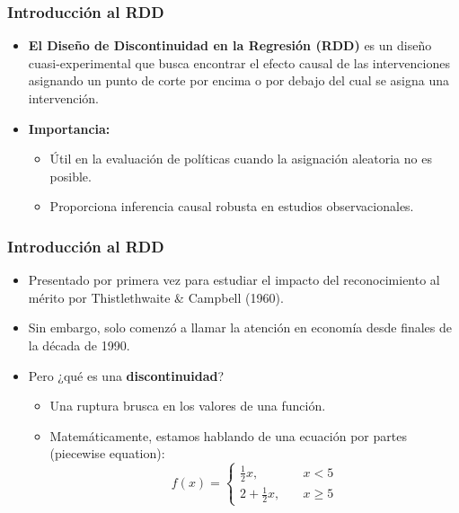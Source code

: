 \documentclass[notes,10pt,aspectratio=169]{beamer}
\begin{document}
\begin{frame}
  \frametitle{Introducción al RDD}

  \begin{itemize}
    \item \textbf{El Diseño de Discontinuidad en la Regresión (RDD)} es un diseño cuasi-experimental que busca encontrar el efecto causal de las intervenciones asignando un punto de corte por encima o por debajo del cual se asigna una intervención.

    \vspace{1em}

    \item \textbf{Importancia:}
    \begin{itemize}
      \item Útil en la evaluación de políticas cuando la asignación aleatoria no es posible.
      \item Proporciona inferencia causal robusta en estudios observacionales.
    \end{itemize}
  \end{itemize}

\end{frame}

\begin{frame}
  \frametitle{Introducción al RDD}

	\begin{itemize}
		\item Presentado por primera vez para estudiar el impacto del reconocimiento al mérito por Thistlethwaite \& Campbell (1960).
		\item Sin embargo, solo comenzó a llamar la atención en economía desde finales de la década de 1990.
		\item Pero ¿qué es una \textbf{discontinuidad}?
		\begin{itemize}
			\item Una ruptura brusca en los valores de una función.
			\item Matemáticamente, estamos hablando de una ecuación por partes (piecewise equation):
			$$
			f(x) = \left\{
			\begin{array}{ll}
			\frac{1}{2} x, 	& \quad x < 5 \\
			2+\frac{1}{2}x,  & \quad x \geq 5
			\end{array}
			\right.
			$$
		\end{itemize}
	\end{itemize}
\end{frame}
\end{document}
